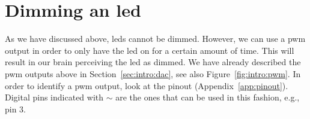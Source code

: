 \section{Dimming an \ac{led}}

As we have discussed above, \acp{led} cannot be dimmed. However, we can use a \ac{pwm} output in order to only have the \ac{led} on for a certain amount of time. This will result in our brain perceiving the \ac{led} as dimmed. We have already described the \ac{pwm} outputs above in Section~\ref{sec:intro:dac}, see also Figure~\ref{fig:intro:pwm}. In order to identify a \ac{pwm} output, look at the pinout (Appendix~\ref{app:pinout}). Digital pins indicated with $\sim$ are the ones that can be used in this fashion, e.g., pin 3.

